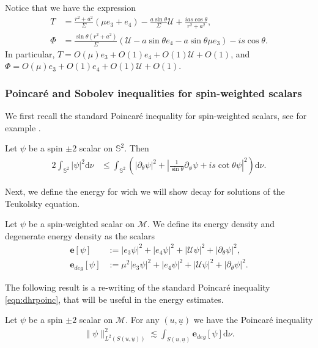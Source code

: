 \documentclass[reqno]{amsart}
\numberwithin{equation}{section}
\newcommand{\mcm}{\mathcal{M}}
\newcommand{\mcu}{\mathcal{U}}
\newcommand{\ubar}{{\underline{u}}}
\newcommand{\dee}{\mathrm{d}}
\newcommand{\sph}{\mathbb S}
\theoremstyle{plain}
\theoremstyle{definition}
\theoremstyle{remark}
\numberwithin{equation}{section}
\begin{document}
\begin{rem}
    Notice that we have the expression
    \begin{align}\label{eqn:expreT}
        T&=\frac{r^2+a^2}{\Sigma}(\mu e_3+e_4)-\frac{a\sin\theta}{\Sigma}\mcu+\frac{ias\cos\theta}{r^2+a^2},\\        \Phi&=\frac{\sin\theta(r^2+a^2)}{\Sigma}(\mcu-a\sin\theta e_4-a\sin\theta\mu e_3)-is\cos\theta.\label{eqn:exprephi}
    \end{align}
    In particular, $T=O(\mu)e_3+O(1)e_4+O(1)\mcu+O(1)$, and $\Phi=O(\mu)e_3+O(1)e_4+O(1)\mcu+O(1)$.
\end{rem}
\subsubsection{Poincaré and Sobolev inequalities for spin-weighted scalars}
We first recall the standard Poincaré inequality for spin-weighted scalars, see for example \cite[Eq. (34)]{dhrteuk}.
\begin{prop}
    Let $\psi$ be a spin $\pm 2$ scalar on $\sph^2$. Then 
    \begin{align}\label{eqn:dhrpoinc}
    2\int_{\sph^2}|\psi|^2\dee\nu&\leq\int_{\sph^2}\left(|\partial_\theta\psi|^2+\left|\frac{1}{\sin\theta}\partial_\phi\psi+is\cot\theta\psi\right|^2\right)\dee\nu.
\end{align}
\end{prop}
Next, we define the energy for wich we will show decay for solutions of the Teukolsky equation. 
\begin{defi}
    Let $\psi$ be a spin-weighted scalar on $\mcm$. We define its energy density and degenerate energy density as the scalars 
\begin{align}
    \mathbf{e}[\psi]&:=|e_3\psi|^2+|e_4\psi|^2+|\mcu\psi|^2+|\partial_\theta\psi|^2,\label{eqn:defener}\\
    \mathbf{e}_{deg}[\psi]&:=\mu^2|e_3\psi|^2+|e_4\psi|^2+|\mcu\psi|^2+|\partial_\theta\psi|^2.\label{eqn:defenerdeg}
\end{align}
\end{defi}
The following result is a re-writing of the standard Poincaré inequality \eqref{eqn:dhrpoinc}, that will be useful in the energy estimates.
\begin{prop}
Let $\psi$ be a spin $\pm2$ scalar on $\mcm$. For any $(u,\ubar)$ we have the Poincaré inequality
\begin{align}\label{eqn:poincare}
    \|\psi\|^2_{L^2(S(u,\ubar))}{\lesssim}\int_{S(u,\ubar)}\mathbf{e}_{deg}[\psi]\dee\nu.
\end{align}
\end{prop}
\end{document}
